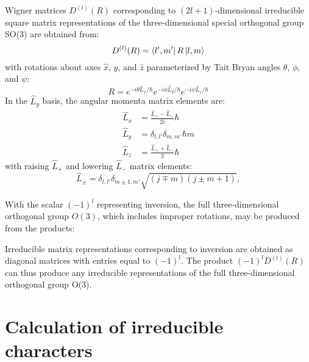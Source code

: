 \documentclass[twocolumn,showpacs,preprintnumbers,superscriptaddress,prb,floatfix,aps,10pt]{revtex4-1}
\begin{document}
Wigner matrices $D^{(l)}(R)$ corresponding to $(2l+1)$-dimensional irreducible square matrix representations of the three-dimensional special orthogonal group SO(3) are obtained from:\cite{martin_electronic_2004}
\begin{equation}
\label{eq:imselfenergy}
D^{(l)}(R) = \bra{l',m'} R \ket{l,m}
\end{equation}
with rotations about axes $\hat{x}$, $\hat{y}$, and $\hat{z}$ parameterized by Tait Bryan angles $\theta$, $\phi$, and $\psi$:
\begin{equation}
R = e^{-i\theta\hat{L}_x/\hbar} e^{-i\phi\hat{L}_y/\hbar} e^{-i\psi\hat{L}_z/\hbar}
\end{equation}
%
In the $\hat{L}_y$ basis, the angular momenta matrix elements are:\cite{shankar_fundamentals_2014}
\begin{align}
\label{eq:angular_momenta}
\hat{L}_x & = \frac{\hat{L}_{+}-\hat{L}_{-}}{2i} \hbar \\
\hat{L}_y & = \delta_{l,l'}\delta_{m,m'} \hbar m \\
\hat{L}_z & = \frac{\hat{L}_{+}+\hat{L}_{-}}{2} \hbar
\end{align}
with raising $\hat{L}_+$ and lowering $\hat{L}_-$ matrix elements:
\begin{equation}
\label{eq:raising_lowering_operator}
\hat{L}_{\pm} = \delta_{l,l'}\delta_{m\pm1,m'} \sqrt{(j\mp m)(j\pm m+1)} ,
\end{equation}

With the scalar $(-1)^l$ representing inversion, the full three-dimensional orthogonal group $O(3)$, which includes improper rotations, may be produced from the products:

Irreducible matrix representations corresponding to inversion are obtained as diagonal matrices with entries equal to $(-1)^l$. The product $(-1)^{l} D^{(l)}(R)$  can thus produce any irreducible representations of the full three-dimensional orthogonal group O(3).\cite{sharma_general_1979,el-batanouny_symmetry_2008} %




%
%
\section{Calculation of irreducible characters}
\end{document}

